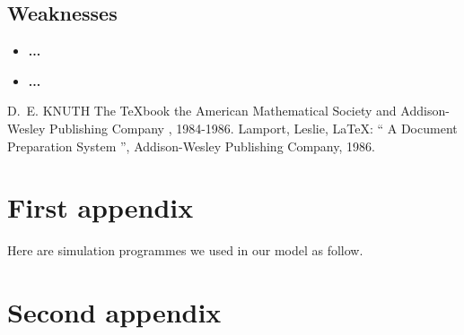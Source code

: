 \documentclass{mcmthesis}
\begin{document}
\subsection{Weaknesses}
\begin{itemize}
  \item \textbf{...}
  \item \textbf{...}
\end{itemize}


\begin{thebibliography}{99}
 D.~E. KNUTH   The \TeX{}book  the American
Mathematical Society and Addison-Wesley
Publishing Company , 1984-1986.
Lamport, Leslie,  \LaTeX{}: `` A Document Preparation System '',
Addison-Wesley Publishing Company, 1986.
\end{thebibliography}

\begin{appendices}

\section{First appendix}

\indent \indent Here are simulation programmes we used in our model as follow.\\

% 

\section{Second appendix}

% 

\end{appendices}
\end{document}

